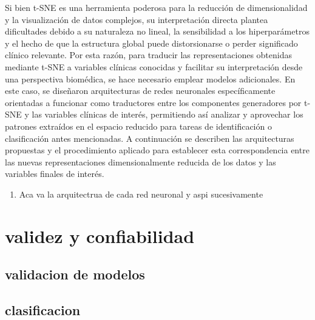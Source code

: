 \documentclass[12pt,letterpaper,oneside,openright]{book}
\begin{document}
Si bien t-SNE es una herramienta poderosa para la reducción de dimensionalidad y la visualización de datos complejos, su interpretación directa plantea dificultades debido a su naturaleza no lineal, la sensibilidad a los hiperparámetros y el hecho de que la estructura global puede distorsionarse o perder significado clínico relevante. Por esta razón, para traducir las representaciones obtenidas mediante t-SNE a variables clínicas conocidas y facilitar su interpretación desde una perspectiva biomédica, se hace necesario emplear modelos adicionales. En este caso, se diseñaron arquitecturas de redes neuronales específicamente orientadas a funcionar como traductores entre los componentes generadores por t-SNE y las variables clínicas de interés, permitiendo así analizar y aprovechar los patrones extraídos en el espacio reducido para tareas de identificación o clasificación antes mencionadas. A continuación se describen las arquitecturas propuestas y el procedimiento aplicado para establecer esta correspondencia entre las nuevas representaciones dimensionalmente reducida de los datos y las variables finales de interés.

\begin{enumerate}
	\item Aca va la arquitectrua de cada red neuronal y aspi sucesivamente 
\end{enumerate}


\section{validez y confiabilidad}

\subsection{validacion de modelos}
\subsection{clasificacion}
\end{document}
